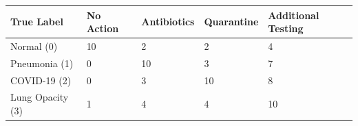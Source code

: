 \begin{tabular}{lllll}
\toprule
True Label & No Action & Antibiotics & Quarantine & Additional Testing \\
\midrule
Normal (0) & 10 & 2 & 2 & 4 \\
Pneumonia (1) & 0 & 10 & 3 & 7 \\
COVID-19 (2) & 0 & 3 & 10 & 8 \\
Lung Opacity (3) & 1 & 4 & 4 & 10 \\
\bottomrule
\end{tabular}
